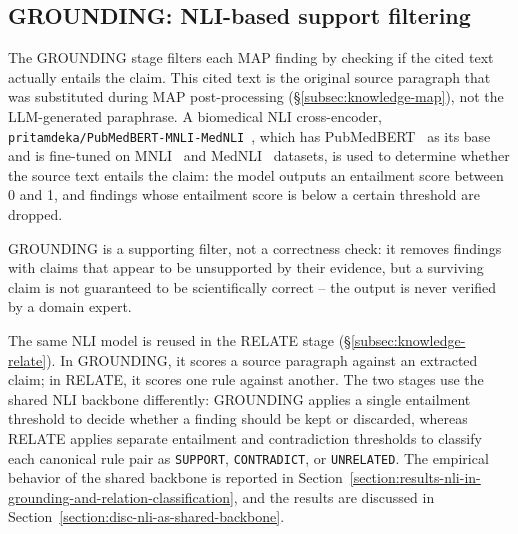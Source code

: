\subsection{GROUNDING: NLI-based support filtering}\label{subsec:knowledge-grounding}

The GROUNDING stage filters each MAP finding by checking if the cited text actually entails the claim. This cited text is the original source paragraph that was substituted during MAP post-processing (§\ref{subsec:knowledge-map}), not the LLM-generated paraphrase. A biomedical NLI cross-encoder, \texttt{pritamdeka/PubMedBERT-MNLI-MedNLI}~\parencite{deka2023pubmedbertextended}, which has PubMedBERT~\parencite{gu2021biomedbert} as its base and is fine-tuned on MNLI~\parencite{williams2018mnli} and MedNLI~\parencite{romanov2018mednli} datasets, is used to determine whether the source text entails the claim: the model outputs an entailment score between 0 and 1, and findings whose entailment score is below a certain threshold are dropped. 

GROUNDING is a supporting filter, not a correctness check: it removes findings with claims that appear to be unsupported by their evidence, but a surviving claim is not guaranteed to be scientifically correct -- the output is never verified by a domain expert. 

The same NLI model is reused in the RELATE stage (§\ref{subsec:knowledge-relate}). In GROUNDING, it scores a source paragraph against an extracted claim; in RELATE, it scores one rule against another. The two stages use the shared NLI backbone differently: GROUNDING applies a single entailment threshold to decide whether a finding should be kept or discarded, whereas RELATE applies separate entailment and contradiction thresholds to classify each canonical rule pair as \texttt{SUPPORT}, \texttt{CONTRADICT}, or \texttt{UNRELATED}. The empirical behavior of the shared backbone is reported in Section~\ref{section:results-nli-in-grounding-and-relation-classification}, and the results are discussed in Section~\ref{section:disc-nli-as-shared-backbone}.